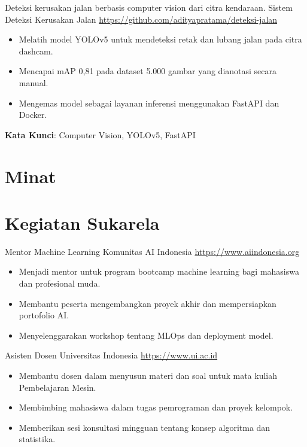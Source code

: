 \documentclass[a4paper, serif, 10pt]{moderncv}
\begin{document}
        {Deteksi kerusakan jalan berbasis computer vision dari citra kendaraan.}
        {Sistem Deteksi Kerusakan Jalan}
        {\url{https://github.com/adityapratama/deteksi-jalan}}
        {}
        {\begin{itemize}
\item Melatih model YOLOv5 untuk mendeteksi retak dan lubang jalan pada citra dashcam.
\item Mencapai mAP 0,81 pada dataset 5.000 gambar yang dianotasi secara manual.
\item Mengemas model sebagai layanan inferensi menggunakan FastAPI dan Docker.
\end{itemize}
\textbf{Kata Kunci}: Computer Vision, YOLOv5, FastAPI}
\section{Minat}

\section{Kegiatan Sukarela}

        {Mentor Machine Learning}
        {Komunitas AI Indonesia}
        {\url{https://www.aiindonesia.org}}
        {}
        {\begin{itemize}
\item Menjadi mentor untuk program bootcamp machine learning bagi mahasiswa dan profesional muda.
\item Membantu peserta mengembangkan proyek akhir dan mempersiapkan portofolio AI.
\item Menyelenggarakan workshop tentang MLOps dan deployment model.
\end{itemize}}
    

        {Asisten Dosen}
        {Universitas Indonesia}
        {\url{https://www.ui.ac.id}}
        {}
        {\begin{itemize}
\item Membantu dosen dalam menyusun materi dan soal untuk mata kuliah Pembelajaran Mesin.
\item Membimbing mahasiswa dalam tugas pemrograman dan proyek kelompok.
\item Memberikan sesi konsultasi mingguan tentang konsep algoritma dan statistika.
\end{itemize}}
    
\end{document}

